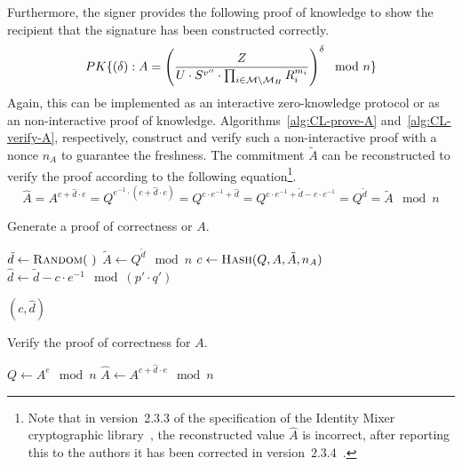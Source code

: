 Furthermore, the signer provides the following proof of knowledge to show the
recipient that the signature has been constructed correctly.
\begin{equation*}
  PK\{(\delta) : A = \left(\dfrac{Z}{U \cdot S^{v''} \cdot
    \prod_{i \in \mathcal{M} \setminus \mathcal{M}_H} R_i^{m_i}} \right)^{\delta} \mod n \}
\end{equation*}
Again, this can be implemented as an interactive zero-knowledge protocol or as
an non-interactive proof of knowledge. Algorithms~\ref{alg:CL-prove-A}
and~\ref{alg:CL-verify-A}, respectively, construct and verify such a
non-interactive proof with a nonce $n_A$ to guarantee the freshness. The
commitment $\tilde{A}$ can be reconstructed to verify the proof according to
the following equation\footnote{Note that in version~2.3.3 of the specification
of the Identity Mixer cryptographic library~\cite{IdemixCrypto2011}, the
reconstructed value $\hat{A}$ is incorrect, after reporting this to the authors
it has been corrected in version~2.3.4~\cite{IdemixCrypto2012}.}.
\begin{equation*}
  \hat{A}
   = A^{c + \hat{d} \cdot e}
   = Q^{e^{-1} \cdot (c + \hat{d} \cdot e)}
   = Q^{c \cdot e^{-1} + \hat{d}}
   = Q^{c \cdot e^{-1} + \tilde{d} - c \cdot e^{-1}}
   = Q^{\tilde{d}}
   = \tilde{A} \mod n
\end{equation*}

\begin{algorithm}
  \caption{Generate a proof of correctness or $A$.}
  \label{alg:CL-prove-A}
  \addtolength{\baselineskip}{1mm}
  \begin{algorithmic}[1]
      \State $\tilde{d} \gets \Call{Random}{~}$
      \State $\tilde{A} \gets Q^{\tilde{d}} \mod n$
      \State $c \gets \Call{Hash}{Q, A, \tilde{A}, n_A}$
      \State $\hat{d} \gets \tilde{d} - c \cdot e^{-1} \mod (p' \cdot q')$

      \Return $(c, \hat{d})$
    \EndFunction
  \end{algorithmic}
\end{algorithm}

\begin{algorithm}
  \caption{Verify the proof of correctness for $A$.}
  \label{alg:CL-verify-A}
  \addtolength{\baselineskip}{1mm}
  \begin{algorithmic}[1]
      \State $Q \gets A^e \mod n$
      \State $\hat{A} \gets A^{c + \hat{d} \cdot e} \mod n$

        \Return {}
      \EndIf

      \Return {}
    \EndFunction
  \end{algorithmic}
\end{algorithm}

